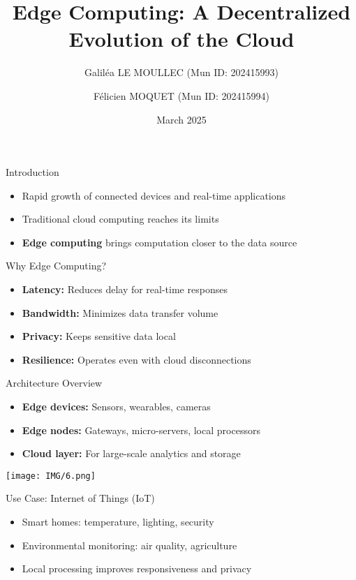 \documentclass{beamer}
\title{Edge Computing: A Decentralized Evolution of the Cloud}
\author{Galiléa LE MOULLEC (Mun ID: 202415993) \and Félicien MOQUET (Mun ID: 202415994)}
\institute{Memorial University of Newfoundland, St. John's, Canada}
\date{March 2025}
\begin{document}
\begin{frame}
  \titlepage
\end{frame}

\begin{frame}{Introduction}
  \begin{itemize}
    \item Rapid growth of connected devices and real-time applications
    \item Traditional cloud computing reaches its limits
    \item \textbf{Edge computing} brings computation closer to the data source
  \end{itemize}
\end{frame}

\begin{frame}{Why Edge Computing?}
  \begin{itemize}
    \item \textbf{Latency:} Reduces delay for real-time responses
    \item \textbf{Bandwidth:} Minimizes data transfer volume
    \item \textbf{Privacy:} Keeps sensitive data local
    \item \textbf{Resilience:} Operates even with cloud disconnections
  \end{itemize}
\end{frame}

\begin{frame}{Architecture Overview}
  \begin{itemize}
    \item \textbf{Edge devices:} Sensors, wearables, cameras
    \item \textbf{Edge nodes:} Gateways, micro-servers, local processors
    \item \textbf{Cloud layer:} For large-scale analytics and storage
  \end{itemize}
  \vspace{0.5cm}
  \centering
  \texttt{[image: IMG/6.png]} %
\end{frame}

\begin{frame}{Use Case: Internet of Things (IoT)}
  \begin{itemize}
    \item Smart homes: temperature, lighting, security
    \item Environmental monitoring: air quality, agriculture
    \item Local processing improves responsiveness and privacy
  \end{itemize}
\end{frame}
\end{document}
